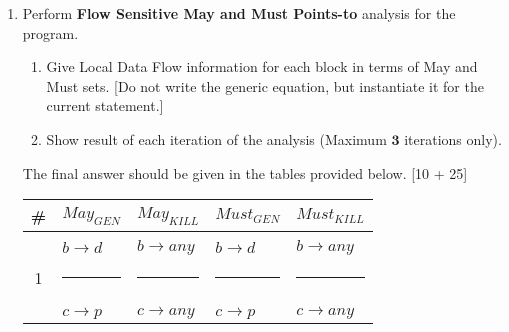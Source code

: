 \documentclass[12pt]{article}
\newcommand{\answer}[1]{{{\blue #1}}}
\begin{document}
\begin{enumerate}
\clearpage
\vspace*{-15mm}\item Perform {\bf Flow Sensitive May and Must Points-to}
  analysis for the program. 
  \begin{enumerate}
  \item Give Local Data Flow information for each block
    in terms of May and Must sets. [Do not write the
      generic equation, but instantiate it for the current
      statement.] 
  \item Show result of each iteration of the analysis
    (Maximum $\mathbf{3}$ iterations only).
  \end{enumerate}
  The final answer should be given in the tables provided
  below.  \hfill[10 + 25] 
\begin{center}
\end{center}
%
\answer{
\begin{center}
\vspace*{-10mm}\renewcommand{\arraystretch}{1.15}
\hspace*{-25mm}\begin{tabular}{|c||l|l||l|l|} \hline
  {\bf \#} & {\bf $May_{GEN}$} & {\bf $May_{KILL}$} & {\bf
    $Must_{GEN}$} & {\bf $Must_{KILL}$}  \\ \hline \hline
  & & & & \\
  & $b\rightarrow d$ & $b\rightarrow any$ & $b\rightarrow d$ &
  $b\rightarrow any$  \\
  1 & \rule{38mm}{0pt}& \rule{38mm}{0pt}& \rule{38mm}{0pt}& \rule{38mm}{0pt}\\ \hline
  & & & & \\
  & $c\rightarrow p$ &
  $c\rightarrow any$ & $c\rightarrow p$ & $c\rightarrow any$\\

\end{tabular}
\end{center}}
\end{enumerate}
\end{document}
